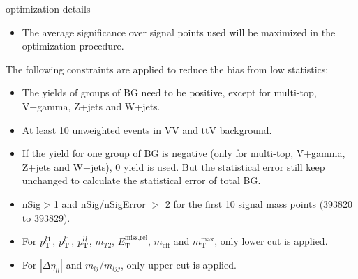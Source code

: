 \documentclass[mathserif,serif]{beamer}
\begin{document}
\begin{frame}{optimization details}
\small
\begin{itemize}
\item The average significance over signal points used will be maximized in the optimization procedure.
\end{itemize}
The following constraints are applied to reduce the bias from low statistics:
\begin{itemize}
\small
\item The yields of groups of BG need to be positive, except for multi-top, V+gamma, Z+jets and W+jets.
\item At least 10 unweighted events in VV and ttV background.
\item If the yield for one group of BG is negative (only for multi-top, V+gamma, Z+jets and W+jets), 0 yield is used. But the statistical error still keep unchanged to calculate the statistical error of total BG.
\item nSig$>$1 and nSig/nSigError $>$ 2 for the first 10 signal mass points (393820 to 393829).
\item For $p_{\text{T}}^{l1}$, $p_{\text{T}}^{l1}$, $p_{\text{T}}^{ll}$, $m_{T2}$, $E_{\text{T}}^{\text{miss,rel}}$, $m_{\text{eff}}$ and $m_{\text{T}}^{\text{max}}$, only lower cut is applied.
\item For $|\Delta\eta_{ll}|$ and $m_{lj}$/$m_{ljj}$, only upper cut is applied.
\end{itemize}
\end{frame}
\end{document}

